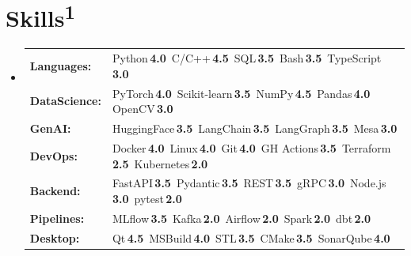 \documentclass[a4paper,11pt]{article}
\newcommand{\maprating}[2]{%
  \IfStrEqCase{#1}{%
    {0}{\def#2{0.00}}%
    {0.0}{\def#2{0.00}}%
    {0.5}{\def#2{0.20}}%
    {1}{\def#2{0.30}}%
    {1.0}{\def#2{0.30}}%
    {1.5}{\def#2{0.35}}%
    {2}{\def#2{0.40}}%
    {2.0}{\def#2{0.40}}%
    {2.5}{\def#2{0.50}}%
    {3}{\def#2{0.60}}%
    {3.0}{\def#2{0.60}}%
    {3.5}{\def#2{0.65}}%
    {4}{\def#2{0.70}}%
    {4.0}{\def#2{0.70}}%
    {4.5}{\def#2{0.80}}%
    {5}{\def#2{1.00}}%
    {5.0}{\def#2{1.00}}%
  }[\def#2{0.50}]%
}
\newcommand{\skillrating}[2]{%
  #1\,\textbf{\color{black!75}#2}\,%
  \smash{\begin{tikzpicture}[baseline=(char.base)]
    \node[black!30, inner sep=0pt] (char) {\faStar};
    \begin{scope}
      \maprating{#2}{\mappedval}
      \clip (char.south west) rectangle ($(char.south west)!\mappedval!(char.south east) + (0, 2em)$);
      \node[NavyBlue!70, inner sep=0pt] at (char) {\faStar};
    \end{scope}
  \end{tikzpicture}}%
}
\newcommand{\skillsep}{\hspace{0.35em}{\scriptsize\color{black!30}\textbullet}\hspace{0.35em}}
\begin{document}
\section{Skills\textsuperscript{1}}
\begin{itemize}[leftmargin=0.15in, label={}, noitemsep, topsep=0pt, parsep=2pt, partopsep=0pt]
    \item \small
    \begin{tabular}{@{} l @{\hspace{1.5ex}} l @{}}
      {\textbf{\color{NavyBlue}Languages:}}    & \skillrating{Python}{4.0}\skillsep\skillrating{C/C++}{4.5}\skillsep\skillrating{SQL}{3.5}\skillsep\skillrating{Bash}{3.5}\skillsep\skillrating{TypeScript}{3.0} \\[3pt]
      {\textbf{\color{NavyBlue}DataScience:}}  & \skillrating{PyTorch}{4.0}\skillsep\skillrating{Scikit-learn}{3.5}\skillsep\skillrating{NumPy}{4.5}\skillsep\skillrating{Pandas}{4.0}\skillsep\skillrating{OpenCV}{3.0} \\[3pt]
      {\textbf{\color{NavyBlue}GenAI:}}        & \skillrating{HuggingFace}{3.5}\skillsep\skillrating{LangChain}{3.5}\skillsep\skillrating{LangGraph}{3.5}\skillsep\skillrating{Mesa}{3.0} \\[3pt]
      {\textbf{\color{NavyBlue}DevOps:}}       & \skillrating{Docker}{4.0}\skillsep\skillrating{Linux}{4.0}\skillsep\skillrating{Git}{4.0}\skillsep\skillrating{GH Actions}{3.5}\skillsep\skillrating{Terraform}{2.5}\skillsep\skillrating{Kubernetes}{2.0} \\[3pt]
      {\textbf{\color{NavyBlue}Backend:}}      & \skillrating{FastAPI}{3.5}\skillsep\skillrating{Pydantic}{3.5}\skillsep\skillrating{REST}{3.5}\skillsep\skillrating{gRPC}{3.0}\skillsep\skillrating{Node.js}{3.0}\skillsep\skillrating{pytest}{2.0} \\[3pt]
      {\textbf{\color{NavyBlue}Pipelines:}}    & \skillrating{MLflow}{3.5}\skillsep\skillrating{Kafka}{2.0}\skillsep\skillrating{Airflow}{2.0}\skillsep\skillrating{Spark}{2.0}\skillsep\skillrating{dbt}{2.0} \\[3pt]
      {\textbf{\color{NavyBlue}Desktop:}}      & \skillrating{Qt}{4.5}\skillsep\skillrating{MSBuild}{4.0}\skillsep\skillrating{STL}{3.5}\skillsep\skillrating{CMake}{3.5}\skillsep\skillrating{SonarQube}{4.0} \\
    \end{tabular}
    \end{itemize}

    \vspace{3pt}
\end{document}
